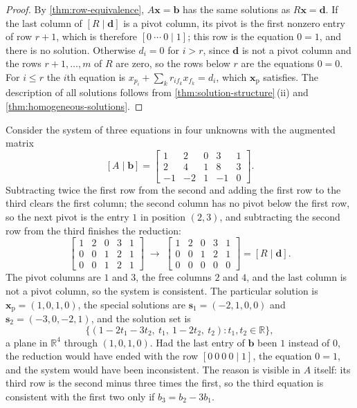 \begin{proof}
By \cref{thm:row-equivalence}, $A\mathbf x=\mathbf b$ has the same solutions as $R\mathbf x=\mathbf d$. If the last column of $[R\mid\mathbf d]$ is a pivot column, its pivot is the first nonzero entry of row $r+1$, which is therefore $[0\ \cdots\ 0\mid1]$; this row is the equation $0=1$, and there is no solution. Otherwise $d_i=0$ for $i>r$, since $\mathbf d$ is not a pivot column and the rows $r+1,\ldots,m$ of $R$ are zero, so the rows below $r$ are the equations $0=0$. For $i\le r$ the $i$th equation is $x_{p_i}+\sum_kr_{if_k}x_{f_k}=d_i$, which $\mathbf x_{\mathrm p}$ satisfies. The description of all solutions follows from \cref{thm:solution-structure}\,(ii) and \cref{thm:homogeneous-solutions}.
\end{proof}

Consider the system of three equations in four unknowns with the augmented matrix
\[
[A\mid\mathbf b]=\left[\begin{array}{rrrr|r}1&2&0&3&1\\2&4&1&8&3\\-1&-2&1&-1&0\end{array}\right].
\]
Subtracting twice the first row from the second and adding the first row to the third clears the first column; the second column has no pivot below the first row, so the next pivot is the entry $1$ in position $(2,3)$, and subtracting the second row from the third finishes the reduction:
\[
\left[\begin{array}{rrrr|r}1&2&0&3&1\\0&0&1&2&1\\0&0&1&2&1\end{array}\right]
\;\longrightarrow\;
\left[\begin{array}{rrrr|r}1&2&0&3&1\\0&0&1&2&1\\0&0&0&0&0\end{array}\right]=[R\mid\mathbf d].
\]
The pivot columns are $1$ and $3$, the free columns $2$ and $4$, and the last column is not a pivot column, so the system is consistent. The particular solution is $\mathbf x_{\mathrm p}=(1,0,1,0)$, the special solutions are $\mathbf s_1=(-2,1,0,0)$ and $\mathbf s_2=(-3,0,-2,1)$, and the solution set is
\[
\bigl\{(1-2t_1-3t_2,\ t_1,\ 1-2t_2,\ t_2): t_1,t_2\in\mathbb R\bigr\},
\]
a plane in $\mathbb R^4$ through $(1,0,1,0)$. Had the last entry of $\mathbf b$ been $1$ instead of $0$, the reduction would have ended with the row $[0\ 0\ 0\ 0\mid1]$, the equation $0=1$, and the system would have been inconsistent. The reason is visible in $A$ itself: its third row is the second minus three times the first, so the third equation is consistent with the first two only if $b_3=b_2-3b_1$.

